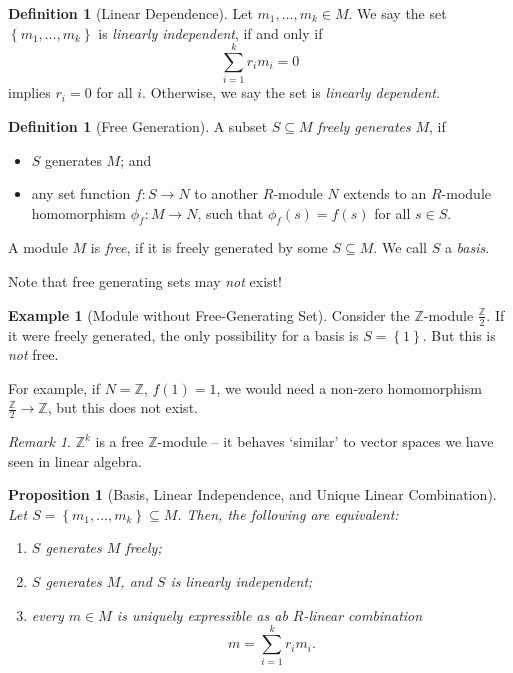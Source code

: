 \documentclass{article}
\newtheorem{proposition}[theorem]{Proposition}
\theoremstyle{definition}
\newtheorem{definition}[theorem]{Definition}
\newtheorem{example}[theorem]{Example}
\theoremstyle{remark}
\newtheorem{remark}[theorem]{Remark}
\newcommand{\pqty}[1]{\left(#1\right)}
\newcommand{\Bqty}[1]{\left\{#1\right\}}
\newcommand{\flatfrac}[2]{\frac{#1}{#2}}
\newcommand{\functiondomain}[3]{#1:#2\to #3}
\newcommand{\ZZ}{\mathbb{Z}}
\begin{document}
\begin{definition}[Linear Dependence]
    \label{def:linear-dependence}%
    Let \(m_1, \ldots, m_k \in M\). We say the set \(\Bqty{m_1, \ldots, m_k}\) is \emph{linearly independent}, if and only if
    \[
        \sum_{i = 1}^{k} r_i m_i = 0
    \]
    implies \(r_i = 0\) for all \(i\). Otherwise, we say the set is \emph{linearly dependent}.
\end{definition}

\begin{definition}[Free Generation]
    \label{def:free-generation}%
    A subset \(S \subseteq M\) \emph{freely generates} \(M\), if
    \begin{itemize}
        \item \(S\) generates \(M\); and
        \item any set function \(\functiondomain{f}{S}{N}\) to another \(R\)-module \(N\) extends to an \(R\)-module homomorphism \(\functiondomain{\phi_f}{M}{N}\), such that \(\phi_f\pqty{s} = f\pqty{s}\) for all \(s \in S\).
    \end{itemize}

    A module \(M\) is \emph{free}, if it is freely generated by some \(S \subseteq M\). We call \(S\) a \emph{basis}.
\end{definition}

Note that free generating sets may \emph{not} exist!

\begin{example}[Module without Free-Generating Set]
    \label{ex:module-without-free-generating-set}%
    Consider the \(\ZZ\)-module \(\flatfrac{\ZZ}{2}\). If it were freely generated, the only possibility for a basis is \(S = \Bqty{1}\). But this is \emph{not} free.

    For example, if \(N = \ZZ\), \(f\pqty{1} = 1\), we would need a non-zero homomorphism \(\flatfrac{\ZZ}{2} \to \ZZ\), but this does not exist.
\end{example}

\begin{remark}
    \(\ZZ^k\) is a free \(\ZZ\)-module -- it behaves `similar' to vector spaces we have seen in linear algebra.
\end{remark}

\begin{proposition}[Basis, Linear Independence, and Unique Linear Combination]
    \label{prop:basis-linear-independence-unique-combination}%
    Let \(S = \Bqty{m_1, \ldots, m_k} \subseteq M\). Then, the following are equivalent:
    \begin{enumerate}
        \item \(S\) generates \(M\) freely;
        \item \(S\) generates \(M\), and \(S\) is linearly independent;
        \item every \(m \in M\) is \emph{uniquely} expressible as ab \(R\)-linear combination
        \[
            m = \sum_{i = 1}^{k} r_i m_i.
        \]
    \end{enumerate}
\end{proposition}
\end{document}
